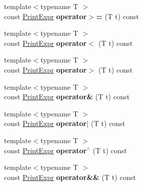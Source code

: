 \begin{DoxyCompactItemize}
\item 
\hypertarget{classPrintExpr_a334a34dda07abd9aea48a6e41a8e165e}{{\footnotesize template$<$typename T $>$ }\\const \hyperlink{classPrintExpr}{Print\-Expr} {\bfseries operator$>$=} (T t) const }\label{classPrintExpr_a334a34dda07abd9aea48a6e41a8e165e}

\item 
\hypertarget{classPrintExpr_a4f03b46ac75405bac225bd7e94f1b385}{{\footnotesize template$<$typename T $>$ }\\const \hyperlink{classPrintExpr}{Print\-Expr} {\bfseries operator$<$} (T t) const }\label{classPrintExpr_a4f03b46ac75405bac225bd7e94f1b385}

\item 
\hypertarget{classPrintExpr_ad6bb35a1f423a7b3caea89bb0431ccaa}{{\footnotesize template$<$typename T $>$ }\\const \hyperlink{classPrintExpr}{Print\-Expr} {\bfseries operator$>$} (T t) const }\label{classPrintExpr_ad6bb35a1f423a7b3caea89bb0431ccaa}

\item 
\hypertarget{classPrintExpr_ad2e19bfd7468ffe5468d8bbad69a8d64}{{\footnotesize template$<$typename T $>$ }\\const \hyperlink{classPrintExpr}{Print\-Expr} {\bfseries operator\&} (T t) const }\label{classPrintExpr_ad2e19bfd7468ffe5468d8bbad69a8d64}

\item 
\hypertarget{classPrintExpr_a72477ad88cddc59f21912daf715c9063}{{\footnotesize template$<$typename T $>$ }\\const \hyperlink{classPrintExpr}{Print\-Expr} {\bfseries operator$\vert$} (T t) const }\label{classPrintExpr_a72477ad88cddc59f21912daf715c9063}

\item 
\hypertarget{classPrintExpr_ad4e4e7e028705d9414c5baed97b5ba8f}{{\footnotesize template$<$typename T $>$ }\\const \hyperlink{classPrintExpr}{Print\-Expr} {\bfseries operator$^\wedge$} (T t) const }\label{classPrintExpr_ad4e4e7e028705d9414c5baed97b5ba8f}

\item 
\hypertarget{classPrintExpr_a7f8a898d80f69ade2f6ccbbfd8bcdab9}{{\footnotesize template$<$typename T $>$ }\\const \hyperlink{classPrintExpr}{Print\-Expr} {\bfseries operator\&\&} (T t) const }\label{classPrintExpr_a7f8a898d80f69ade2f6ccbbfd8bcdab9}


\end{DoxyCompactItemize}
